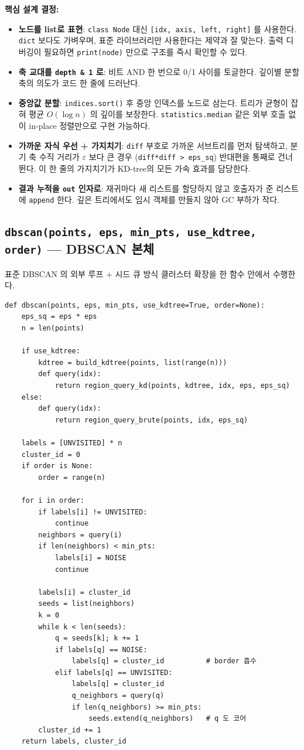 \documentclass[12pt, a4paper]{article}
\begin{document}
\noindent\textbf{핵심 설계 결정:}
\begin{itemize}
    \item \textbf{노드를 list로 표현}: \texttt{class Node} 대신 \texttt{[idx, axis, left, right]} 를 사용한다. \texttt{dict} 보다도 가벼우며, 표준 라이브러리만 사용한다는 제약과 잘 맞는다. 출력 디버깅이 필요하면 \texttt{print(node)} 만으로 구조를 즉시 확인할 수 있다.
    \item \textbf{축 교대를 \texttt{depth \& 1} 로}: 비트 AND 한 번으로 0/1 사이를 토글한다. 깊이별 분할 축의 의도가 코드 한 줄에 드러난다.
    \item \textbf{중앙값 분할}: \texttt{indices.sort()} 후 중앙 인덱스를 노드로 삼는다. 트리가 균형이 잡혀 평균 $O(\log n)$ 의 깊이를 보장한다. \texttt{statistics.median} 같은 외부 호출 없이 in-place 정렬만으로 구현 가능하다.
    \item \textbf{가까운 자식 우선 + 가지치기}: \texttt{diff} 부호로 가까운 서브트리를 먼저 탐색하고, 분기 축 수직 거리가 $\varepsilon$ 보다 큰 경우 (\texttt{diff*diff > eps\_sq}) 반대편을 통째로 건너뛴다. 이 한 줄의 가지치기가 KD-tree의 모든 가속 효과를 담당한다.
    \item \textbf{결과 누적을 \texttt{out} 인자로}: 재귀마다 새 리스트를 할당하지 않고 호출자가 준 리스트에 \texttt{append} 한다. 깊은 트리에서도 임시 객체를 만들지 않아 GC 부하가 작다.
\end{itemize}


\subsection{\texttt{dbscan(points, eps, min\_pts, use\_kdtree, order)} --- DBSCAN 본체}

표준 DBSCAN 의 외부 루프 + 시드 큐 방식 클러스터 확장을 한 함수 안에서 수행한다.

\begin{verbatim}
def dbscan(points, eps, min_pts, use_kdtree=True, order=None):
    eps_sq = eps * eps
    n = len(points)

    if use_kdtree:
        kdtree = build_kdtree(points, list(range(n)))
        def query(idx):
            return region_query_kd(points, kdtree, idx, eps, eps_sq)
    else:
        def query(idx):
            return region_query_brute(points, idx, eps_sq)

    labels = [UNVISITED] * n
    cluster_id = 0
    if order is None:
        order = range(n)

    for i in order:
        if labels[i] != UNVISITED:
            continue
        neighbors = query(i)
        if len(neighbors) < min_pts:
            labels[i] = NOISE
            continue

        labels[i] = cluster_id
        seeds = list(neighbors)
        k = 0
        while k < len(seeds):
            q = seeds[k]; k += 1
            if labels[q] == NOISE:
                labels[q] = cluster_id          # border 흡수
            elif labels[q] == UNVISITED:
                labels[q] = cluster_id
                q_neighbors = query(q)
                if len(q_neighbors) >= min_pts:
                    seeds.extend(q_neighbors)   # q 도 코어
        cluster_id += 1
    return labels, cluster_id
\end{verbatim}
\end{document}
